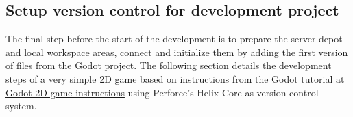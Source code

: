 \subsection{Setup version control for development project}
The final step before the start of the development is to prepare the server depot and local workspace areas, connect 
and initialize them by adding the first version of files from the Godot project. 
The following section details the development steps of a very simple 2D game based on instructions from the Godot 
tutorial at \href{https://docs.godotengine.org/en/stable/getting_started/first_2d_game/index.html}{\color{blue}Godot 2D game instructions}
using Perforce's Helix Core as version control system.
